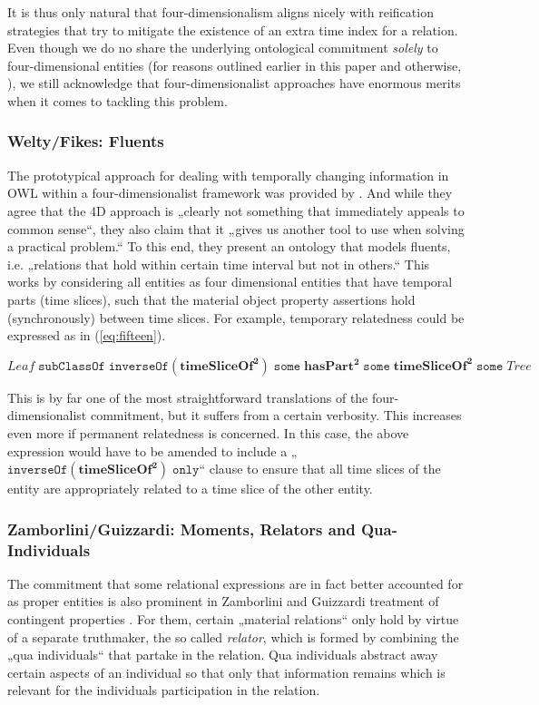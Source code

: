 \documentclass{ao2e}
\newcommand{\mirel}[1]{\ensuremath{\mathrm{\mathbf{#1}}}}
\newcommand{\mclass}[1]{\ensuremath{\mathit{#1}}}
\newcommand{\mrel}[2]{\mirel{#1^#2}}
\newcommand{\mrelb}[1]{\mrel{#1}{2}}
\begin{document}
It is thus only natural that four-dimensionalism aligns nicely with reification
strategies that try to mitigate the existence of an extra time index for a
relation. Even though we do no share the underlying ontological commitment 
\emph{solely} to four-dimensional entities (for reasons outlined earlier in
this paper and
otherwise, \cite{BFO1:ref}), we still acknowledge that four-dimensionalist
approaches have enormous merits when it comes to tackling this problem.

\subsubsection{Welty/Fikes: Fluents}
The prototypical approach for dealing with temporally changing information in
OWL within a four-dimensionalist framework was provided by 
\cite{Welty:2006}. And while they agree that the 4D  approach is „clearly 
not something that immediately appeals to common sense“, they also claim
that it „gives us another tool to use when solving a practical problem.“ To this
end, they present an ontology that models fluents, i.e. „relations that hold
within certain time interval but not in others.“ This works by considering all
entities as four dimensional entities that have temporal parts (time slices),
such that the material object property assertions hold (synchronously) between
time slices. For example, temporary relatedness could be expressed as in
(\ref{eq:fifteen}).

\begin{equation}
\mclass{Leaf}\;\mathtt{subClassOf}\;\mathtt{inverseOf}(\mrelb{timeSliceOf})\;\mathtt{some}\;
            \mrelb{hasPart}\;\mathtt{some}\;\mrelb{timeSliceOf}\;\mathtt{some}\;\mclass{Tree}
\label{eq:fifteen}
\end{equation}

This is by far one of the most straightforward translations of the
four-dimensionalist commitment, but it suffers from a certain verbosity. This
increases even more if permanent relatedness is concerned. In this case, the
above expression would have to be amended to include a
„$\mathtt{inverseOf}(\mrelb{timeSliceOf})\;\mathtt{only}$“ clause to ensure that
all time slices of the entity are appropriately related to a time slice of the
other entity.

\subsubsection{Zamborlini/Guizzardi: Moments, Relators and Qua-Individuals}
The commitment that some relational expressions are in fact better accounted for
as proper entities is also prominent in Zamborlini and Guizzardi treatment of 
contingent properties \cite{Zamborlini:Guizzardi}. For them, certain „material
relations“ only hold by virtue of a separate truthmaker, the so called
\emph{relator}, which is formed by combining the „qua individuals“ that
partake in the relation. Qua individuals abstract away certain aspects of an
individual so that only that information remains which is relevant for the
individuals participation in the relation. 
\end{document}
